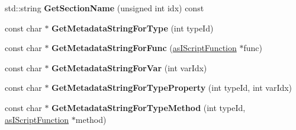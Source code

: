 \begin{DoxyCompactItemize}
std\+::string {\bfseries Get\+Section\+Name} (unsigned int idx) const
\item 
\mbox{\label{class_c_script_builder_a932195b28ef83c8384bb3acb5dec4e75}} 
const char $\ast$ {\bfseries Get\+Metadata\+String\+For\+Type} (int type\+Id)
\item 
\mbox{\label{class_c_script_builder_a1861aa65833fe91dad30b1a4a070848d}} 
const char $\ast$ {\bfseries Get\+Metadata\+String\+For\+Func} (\hyperlink{classas_i_script_function}{as\+I\+Script\+Function} $\ast$func)
\item 
\mbox{\label{class_c_script_builder_aa3122c51ed5a704f7dcd8937329d3722}} 
const char $\ast$ {\bfseries Get\+Metadata\+String\+For\+Var} (int var\+Idx)
\item 
\mbox{\label{class_c_script_builder_a7e9823cf67e2ea37f105413978ff101e}} 
const char $\ast$ {\bfseries Get\+Metadata\+String\+For\+Type\+Property} (int type\+Id, int var\+Idx)
\item 
\mbox{\label{class_c_script_builder_ab85394ca1ed9d0331e154dc4ab8f6327}} 
const char $\ast$ {\bfseries Get\+Metadata\+String\+For\+Type\+Method} (int type\+Id, \hyperlink{classas_i_script_function}{as\+I\+Script\+Function} $\ast$method)
\end{DoxyCompactItemize}
